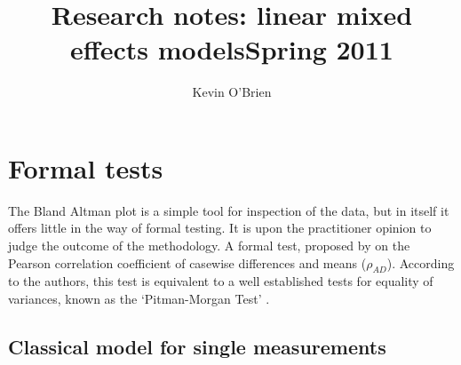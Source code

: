\documentclass[12pt, a4paper]{report}
\title{Research notes: linear mixed effects models}
\author{ } \date{ }
\theoremstyle{plain}
\theoremstyle{definition}
\theoremstyle{remark}
\begin{document}
	\author{Kevin O'Brien}
	\title{Spring 2011}
	
	
	\tableofcontents



%



\chapter{Formal tests}


The Bland Altman plot is a simple tool for inspection of the data,
but in itself it offers little in the way of formal testing. It is upon the practitioner opinion to judge the outcome of the methodology.
A formal test, proposed by \citet{BA83} on the Pearson correlation coefficient of casewise differences and means ($\rho_{AD}$). According to the authors, this test is equivalent to a well established tests for equality of variances, known as the `Pitman-Morgan Test' \citep{Pitman,
	Morgan}.

	\section{Classical model for single measurements}
\end{document}
